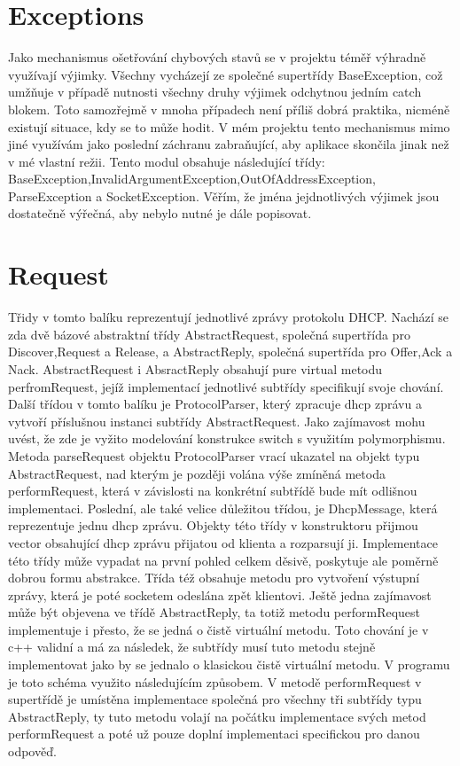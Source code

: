 \documentclass[12pt,a4paper]{report}
\begin{document}
\section*{Exceptions}
Jako mechanismus ošetřování chybových stavů se v projektu téměř výhradně využívají výjimky. Všechny vycházejí ze společné supertřídy BaseException, což umžňuje v případě nutnosti všechny druhy výjimek odchytnou jedním catch blokem. Toto samozřejmě v mnoha případech není příliš dobrá praktika, nicméně existují situace, kdy se to může hodit. V mém projektu tento mechanismus mimo jiné využívám jako poslední záchranu zabraňující, aby aplikace skončila jinak než v mé vlastní režii. 
Tento modul obsahuje následující třídy: BaseException,InvalidArgumentException,OutOfAddressException,\\ParseException a SocketException.
Věřím, že jména jejdnotlivých výjimek jsou dostatečně výřečná, aby nebylo nutné je dále popisovat. 
\section*{Request}
Třidy v tomto balíku reprezentují jednotlivé zprávy protokolu DHCP. Nachází se zda dvě bázové abstraktní třídy AbstractRequest, společná supertřída pro Discover,Request a Release, a AbstractReply, společná supertřída pro Offer,Ack a Nack. AbstractRequest i AbsractReply obsahují pure virtual metodu perfromRequest, jejíž implementací jednotlivé subtřídy specifikují svoje chování. Další třídou v tomto balíku je ProtocolParser, který zpracuje dhcp zprávu a vytvoří příslušnou instanci subtřídy AbstractRequest. Jako zajímavost mohu uvést, že zde je vyžito modelování konstrukce switch s využitím polymorphismu. Metoda parseRequest objektu ProtocolParser vrací ukazatel na objekt typu AbstractRequest, nad kterým je později volána výše zmíněná metoda performRequest, která v závislosti na konkrétní subtřídě bude mít odlišnou implementaci. Poslední, ale také velice důležitou třídou, je DhcpMessage, která reprezentuje jednu dhcp zprávu. Objekty této třídy v konstruktoru přijmou vector obsahující dhcp zprávu přijatou od klienta a rozparsují ji. Implementace této třídy může vypadat na první pohled celkem děsivě, poskytuje ale poměrně dobrou formu abstrakce. Třída též obsahuje metodu pro vytvoření výstupní zprávy, která je poté socketem odeslána zpět klientovi. Ještě jedna zajímavost může být objevena ve třídě AbstractReply, ta totiž metodu performRequest implementuje i přesto, že se jedná o čistě virtuální metodu. Toto chování je v c++ validní a má za následek, že subtřídy musí tuto metodu stejně implementovat jako by se jednalo o klasickou čistě virtuální metodu. V programu je toto schéma využito následujícím způsobem. V metodě performRequest v supertřídě je umístěna implementace společná pro všechny tři subtřídy typu AbstractReply, ty tuto metodu volají na počátku implementace svých metod performRequest a poté už pouze doplní implementaci specifickou pro danou odpověď.
\end{document}
